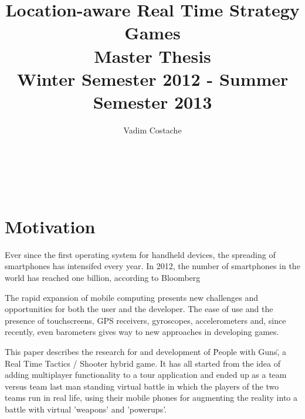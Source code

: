 \documentclass{article}
\title{Location-aware Real Time Strategy Games \\ Master Thesis \\
Winter Semester 2012 - Summer Semester 2013}
\author{Vadim Costache} %
\begin{document}
\maketitle %

\setlength\parindent{0pt} %

\renewcommand{\labelenumi}{\alph{enumi}.} %

\newcommand{\superscript}[1]{\ensuremath{^{\textrm{#1}}}}
\newcommand{\subscript}[1]{\ensuremath{_{\textrm{#1}}}}



   
\begin{verbatim}



\end{verbatim}
     
\tableofcontents

\newpage


\section{Motivation}

Ever since the first operating system for handheld devices, the spreading of
smartphones has intensifed every year. In 2012, the number of smartphones in the
world has reached one billion, according to Bloomberg\cite{bloomberg} \newline

The rapid expansion of mobile computing presents new challenges and
opportunities for both the user and the developer. The ease of use and the
presence of touchscreens, GPS receivers, gyroscopes, accelerometers and, since
recently, even barometers gives way to new approaches in developing
games.\newline

This paper describes the research for and development of \"People with Guns\", a
Real Time Tactics / Shooter hybrid game. It has all started from the idea of
adding multiplayer functionality to a tour application and ended up as a team
versus team last man standing virtual battle in which the players of the two
teams run in real life, using their mobile phones for augmenting the reality
into a battle with virtual 'weapons' and 'powerups'.\newline
\end{document}

